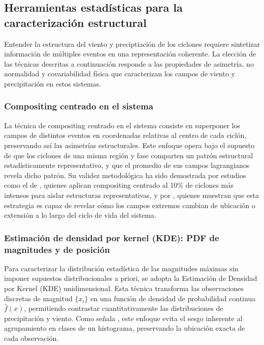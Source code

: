 \subsection{Herramientas estadísticas para la caracterización estructural}\label{subsec:tb_herramientas}

Entender la estructura del viento y preciptiación de los ciclones requiere sintetizar información de múltiples eventos en una representación coherente. 
La elección de las técnicas descritas a continuación responde a las propiedades de asimetría, no normalidad y covariabilidad física que caracterizan los campos de viento y precipitación en estos sistemas.

\subsubsection{Compositing centrado en el sistema}\label{subsubsec:tb_compositing}

La técnica de compositing centrado en el sistema consiste en superponer los campos de distintos eventos en coordenadas relativas al centro de cada ciclón, preservando así las asimetrías estructurales. 
Este enfoque opera bajo el supuesto de que los ciclones de una misma región y fase comparten un patrón estructural estadísticamente representativo, y que el promedio de sus campos lagrangianos revela dicho patrón. 
Su validez metodológica ha sido demostrada por estudios como el de \citet{priestley2022improved}, quienes aplican compositing centrado al 10\% de ciclones más intensos para aislar estructuras representativas, y por \citet{han2025system}, quienes muestran que esta estrategia es capaz de revelar cómo los campos extremos cambian de ubicación o extensión a lo largo del ciclo de vida del sistema.

\subsubsection{Estimación de densidad por kernel (KDE): PDF de magnitudes y de posición}\label{subsubsec:tb_kde}

Para caracterizar la distribución estadística de las magnitudes máximas sin imponer supuestos distribucionales a priori, se adopta la Estimación de Densidad por Kernel (KDE) unidimensional. 
Esta técnica transforma las observaciones discretas de magnitud $\{x_i\}$ en una función de densidad de probabilidad continua $\hat{f}(x)$, permitiendo contrastar cuantitativamente las distribuciones de precipitación y viento. 
Como señala \citet{weglarczyk2018kernel}, este enfoque evita el sesgo inherente al agrupamiento en clases de un histograma, preservando la ubicación exacta de cada observación. 

